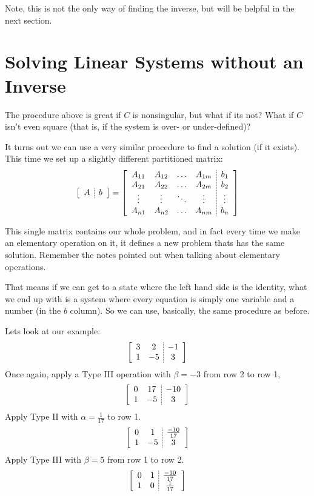 Note, this is not the only way of finding the inverse, but will be helpful in the next section. 

\section{Solving Linear Systems without an Inverse}
The procedure above is great if $C$ is nonsingular, but what if its not?
What if $C$ isn't even square (that is, if the system is over- or under-defined)?

It turns out we can use a very similar procedure to find a solution (if it exists). 
This time we set up a slightly different partitioned matrix: 
\[
\left[\begin{array}{c;{2pt/1pt}c}A&b\end{array}\right] = 
\left[\begin{array}{cccc;{2pt/1pt}c}
A_{11} & A_{12} & \hdots & A_{1m} & b_1\\
A_{21} & A_{22} & \hdots & A_{2m} & b_2\\
\vdots & \vdots & \ddots & \vdots &\vdots  \\
A_{n1} & A_{n2} & \hdots & A_{nm} & b_n\\
\end{array}\right]
\]

This single matrix contains our whole problem, 
and in fact every time we make an elementary operation on it, 
it defines a new problem thats has the same solution. 
Remember the notes pointed out when talking about elementary operations. 

That means if we can get to a state where the left hand side is the identity,
what we end up with is a system where every equation is simply one variable and a number (in the $b$ column). 
So we can use, basically, the same procedure as before. 

Lets look at our example:
\[\left[\begin{array}{cc;{2pt/1pt}c} 3 & 2 & -1\\ 1 & -5 & 3\end{array}\right]\]
Once again, apply a Type III operation with $\beta=-3$ from row 2 to row 1,
\[\left[\begin{array}{cc;{2pt/1pt}c} 0 & 17 & -10\\ 1 & -5 & 3\end{array}\right]\]
Apply Type II with $\alpha=\frac{1}{17}$ to row 1. 
\[\left[\begin{array}{cc;{2pt/1pt}c} 0 & 1 & \frac{-10}{17}\\ 1 & -5 & 3\end{array}\right]\]
Apply Type III with $\beta=5$ from row 1 to row 2.
\[\left[\begin{array}{cc;{2pt/1pt}c} 0 & 1 & \frac{-10}{17}\\ 1 & 0 & \frac{1}{17}\end{array}\right]\]

